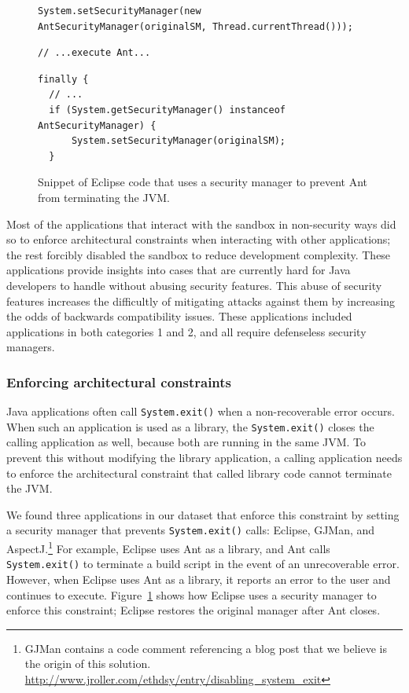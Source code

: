 \documentclass{sig-alternate}
\begin{document}
\begin{figure}
\begin{lstlisting}[firstnumber=691]
System.setSecurityManager(new AntSecurityManager(originalSM, Thread.currentThread()));
\end{lstlisting}
\vspace{-0.3cm}
\begin{lstlisting}[firstnumber=703]
// ...execute Ant...
\end{lstlisting}
\vspace{-0.3cm}
\begin{lstlisting}[firstnumber=723]
finally {
  // ...
  if (System.getSecurityManager() instanceof AntSecurityManager) { 
      System.setSecurityManager(originalSM); 
  }
\end{lstlisting}\vspace{-0.3cm}
\caption{Snippet of Eclipse code that uses a security manager to prevent Ant\label{fig:Eclipse-snippet}
from terminating the JVM.}
\end{figure}

Most of the applications that interact with the sandbox in
non-security ways did so to enforce architectural constraints when interacting with
other applications; the rest forcibly disabled the sandbox to reduce development
complexity. These applications provide insights into cases that are currently
hard for Java developers to handle without abusing security features. This abuse
of security features increases the difficultly of mitigating attacks against
them by increasing the odds of backwards compatibility issues.  These applications
included applications in both categories 1 and 2, and all require defenseless security managers.

\subsubsection{Enforcing architectural constraints}

Java applications often call \texttt{System.exit()} when a non-recoverable
error occurs.  When such an application is 
used as a library, the \texttt{System.exit()} closes the calling
application as well, because both 
are running in the same JVM. 
To prevent this without modifying the library application,
a calling application needs to enforce the architectural constraint
that called library code cannot terminate the JVM. 

We found three applications in our dataset that 
enforce this constraint by setting a security manager
that prevents \texttt{System.exit()} calls:
Eclipse, GJMan, and AspectJ.\footnote{%
GJMan contains a code comment referencing a
blog post that we believe is the origin of this solution. \url{http://www.jroller.com/ethdsy/entry/disabling_system_exit}}
For example, Eclipse uses Ant as a library, and Ant calls \texttt{System.exit()} to
terminate a build script in the event of an unrecoverable
error.  However, when Eclipse uses Ant as a library, it
reports an error to the user and continues to execute. 
Figure~\ref{fig:Eclipse-snippet} shows
how Eclipse uses a security manager to enforce this constraint; Eclipse restores
the original manager after Ant closes.
\end{document}
